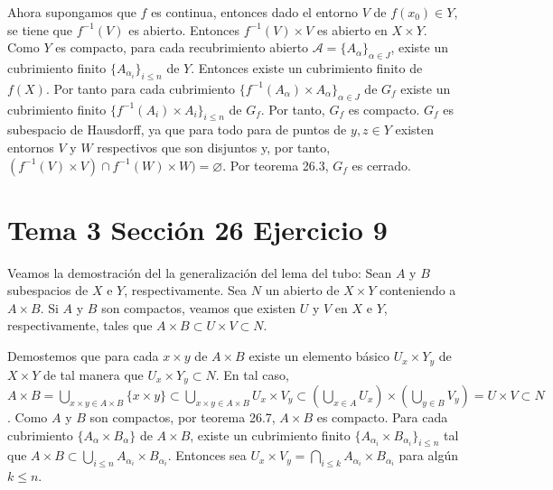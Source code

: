\documentclass{article}
\begin{document}
Ahora supongamos que $f$ es continua, entonces dado el entorno $V$ de $f(x_0)\in Y$, se tiene que $f^{-1}(V)$ es abierto. Entonces $f^{-1}(V)\times V$ es abierto en $X\times Y$. Como $Y$ es compacto, para cada recubrimiento abierto $\mathcal{A}=\{A_\alpha\}_{\alpha\in J}$, existe un cubrimiento finito $\{A_{\alpha_i}\}_{i\leq n}$ de $Y$. Entonces existe un cubrimiento finito de $f(X)$. Por tanto para cada cubrimiento $\{f^{-1}(A_\alpha)\times A_\alpha\}_{\alpha\in J}$ de $G_f$ existe un cubrimiento finito $\{f^{-1}(A_i)\times A_i\}_{i\leq n}$ de $G_f$. Por tanto, $G_f$ es compacto. $G_f$ es subespacio de Hausdorff, ya que para todo para de puntos de $y,z\in Y$ existen entornos $V$ y $W$ respectivos que son disjuntos y, por tanto, $(f^{-1}(V)\times V)\cap  f^{-1}(W)\times W)=\varnothing$. Por teorema 26.3, $G_f$ es cerrado.
\section{Tema 3 Sección 26 Ejercicio 9}
Veamos la demostración del la generalización del lema del tubo: Sean $A$ y $B$ subespacios de $X$ e $Y$, respectivamente. Sea $N$ un abierto de $X\times Y$ conteniendo a $A\times B$. Si $A$ y $B$ son compactos, veamos que existen $U$ y $V$ en $X$ e $Y$, respectivamente, tales que $A\times B\subset U\times V\subset N$.

Demostemos que para cada $x\times y$ de $A\times B$ existe un elemento básico $U_x\times Y_y$ de $X\times Y$ de tal manera que $U_x\times Y_y\subset N$. En tal caso, $A\times B=\bigcup_{x\times y\in A\times B}\{x\times y\}\subset \bigcup_{x\times y\in A\times B}U_x\times V_y\subset  (\bigcup_{x\in A}U_x)\times(\bigcup_{y\in B}V_y)=U\times V\subset N$. Como $A$ y $B$ son compactos, por teorema 26.7, $A\times B$ es compacto. Para cada cubrimiento $\{A_\alpha \times B_\alpha\}$ de $A\times B$, existe un cubrimiento finito $\{A_{\alpha_i}\times B_{\alpha_i}\}_{i\leq n}$ tal que  $A\times B\subset \bigcup_{i\leq n} A_{\alpha_i}\times B_{\alpha_i}$. Entonces sea $U_x\times V_y=\bigcap_{i\leq k}A_{\alpha_i}\times B_{\alpha_i}$ para algún $k\leq n$.
\end{document}
